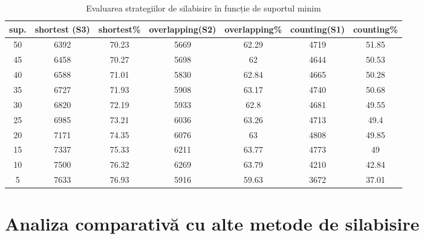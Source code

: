 \begin{table}[h!]
\centering
\begin{tabular}{|c|c|c|c|c|c|c|}
\hline
sup. & shortest (S3) & shortest\% & overlapping(S2) & overlapping\%& counting(S1) & counting\% \\ 
\hline
\hline
50 & 6392 & 70.23 & 5669 & 62.29 & 4719 & 51.85\\ 
\hline
45 & 6458 & 70.27 & 5698 & 62 & 4644 & 50.53\\ 
\hline
40 & 6588 & 71.01 & 5830 & 62.84 & 4665 & 50.28\\ 
\hline
35 & 6727 & 71.93 & 5908 & 63.17 & 4740 & 50.68\\ 
\hline
30 & 6820 & 72.19 & 5933 & 62.8 & 4681 & 49.55\\ 
\hline
25 & 6985 & 73.21 & 6036 & 63.26 & 4713 & 49.4\\ 
\hline
20 & 7171 & 74.35 & 6076 & 63 & 4808 & 49.85\\ 
\hline
15 & 7337 & 75.33 & 6211 & 63.77 & 4773 & 49\\ 
\hline
10 & 7500 & 76.32 & 6269 & 63.79 & 4210 & 42.84\\ 
\hline
5 & 7633 & 76.93 & 5916 & 59.63 & 3672 & 37.01\\ 
\hline\end{tabular}
\label{table:table}
\caption{Evaluarea strategiilor de silabisire în funcție de suportul minim} 
\end{table}



\section{Analiza comparativă cu alte metode de silabisire}